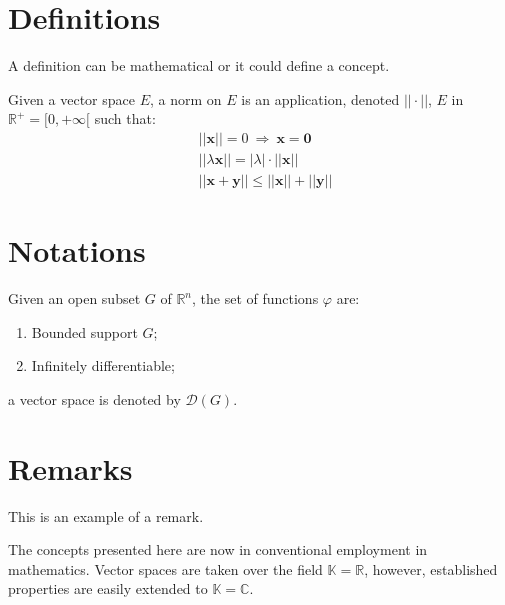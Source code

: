 \documentclass[
	11pt, %
	fleqn, %
	a4paper, %
]{LegrandOrangeBook}
\begin{document}

\section{Definitions}

A definition can be mathematical or it could define a concept.

\begin{definition}[Definition name] %
	Given a vector space $E$, a norm on $E$ is an application, denoted $||\cdot||$, $E$ in $\mathbb{R}^+=[0,+\infty[$ such that:
	\begin{align}
		& ||\mathbf{x}||=0\ \Rightarrow\ \mathbf{x}=\mathbf{0}\\
		& ||\lambda \mathbf{x}||=|\lambda|\cdot ||\mathbf{x}||\\
		& ||\mathbf{x}+\mathbf{y}||\leq ||\mathbf{x}||+||\mathbf{y}||
	\end{align}
\end{definition}


\section{Notations}

\begin{notation} %
	Given an open subset $G$ of $\mathbb{R}^n$, the set of functions $\varphi$ are:
	\begin{enumerate}
		\item Bounded support $G$;
		\item Infinitely differentiable;
	\end{enumerate}
	a vector space is denoted by $\mathcal{D}(G)$. 
\end{notation}


\section{Remarks}

This is an example of a remark.

\begin{remark}
	The concepts presented here are now in conventional employment in mathematics. Vector spaces are taken over the field $\mathbb{K}=\mathbb{R}$, however, established properties are easily extended to $\mathbb{K}=\mathbb{C}$.
\end{remark}
\end{document}
